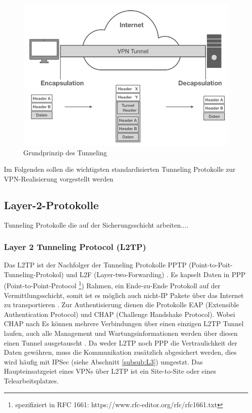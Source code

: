 \begin{figure}[h]
	\includegraphics[width=\linewidth]{tunneling}
	\caption{Grundprinzip des Tunneling}
	\label{tunnel}
\end{figure}

 Im Folgenden sollen die wichtigsten standardisierten  Tunneling Protokolle zur VPN-Realisierung vorgestellt werden

\subsection{Layer-2-Protokolle}
Tunneling Protokolle die auf der Sicherungsschicht arbeiten....


\subsubsection{Layer 2 Tunneling Protocol (L2TP)}
Das L2TP ist der Nachfolger der Tunneling Protokolle PPTP (Point-to-Poit-Tunneling-Protokol) und L2F (Layer-two-Forwarding) \cite{isi-vpn}. Es kapselt Daten in PPP (Point-to-Point-Protocol \footnote{spezifiziert in RFC 1661: https://www.rfc-editor.org/rfc/rfc1661.txt}) Rahmen, ein Ende-zu-Ende Protokoll auf der Vermittlungsschicht, somit ist es möglich auch nicht-IP Pakete über das Internet zu transportieren \cite{gokulakrishnan2014survey}. Zur Authentisierung dienen die Protokolle EAP (Extensible Authentication Protocol) und CHAP (Challenge Handshake Protocol). Wobei CHAP nach \cite{eckert2018sicherheit}
Es können mehrere Verbindungen über einen einzigen L2TP Tunnel laufen, auch alle Management und Wartungsinformationen werden über diesen einen Tunnel ausgetauscht \cite{bohmer2005vpn}.
Da weder L2TP noch PPP die Vertraulichkeit der Daten gewähren, muss die Kommunikation zusätzlich abgesichert werden, dies wird häufig mit IPSec (siehe Abschnitt \ref{subsub:L3}) umgestzt. 
Das Haupteinsatzgeiet eines VPNs über L2TP ist ein Site-to-Site oder eines Telearbeitsplatzes.   

